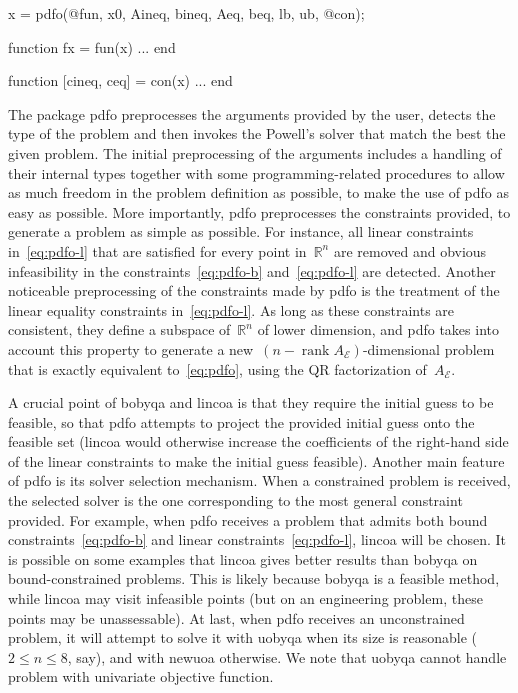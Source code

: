 \documentclass[11pt,draft]{article}
\numberwithin{equation}{section}
\DeclareMathOperator\rank{rank}
\newcommand{\R}{\mathbb{R}}
\newcommand{\aeq}{A_{\scriptscriptstyle\mathcal{E}}}
\begin{document}
\begin{matlablst}[%
    caption=An elementary example of \gls{pdfo} in MATLAB,
    label=lst:minex
]
    x = pdfo(@fun, x0, Aineq, bineq, Aeq, beq, lb, ub, @con);

    function fx = fun(x)
    ...
    end

    function [cineq, ceq] = con(x)
    ...
    end
\end{matlablst}

The package \gls{pdfo} preprocesses the arguments provided by the user, detects the type of the problem and then invokes the Powell's solver that match the best the given problem.
The initial preprocessing of the arguments includes a handling of their internal types together with some programming-related procedures to allow as much freedom in the problem definition as possible, to make the use of \gls{pdfo} as easy as possible.
More importantly, \gls{pdfo} preprocesses the constraints provided, to generate a problem as simple as possible.
For instance, all linear constraints in~\cref{eq:pdfo-l} that are satisfied for every point in~$\R^n$ are removed and obvious infeasibility in the constraints~\cref{eq:pdfo-b} and~\cref{eq:pdfo-l} are detected.
Another noticeable preprocessing of the constraints made by \gls{pdfo} is the treatment of the linear equality constraints in~\cref{eq:pdfo-l}.
As long as these constraints are consistent, they define a subspace of~$\R^n$ of lower dimension, and \gls{pdfo} takes into account this property to generate a new~$(n - \rank \aeq)$-dimensional problem that is exactly equivalent to~\cref{eq:pdfo}, using the QR factorization of~$\aeq$.

A crucial point of \gls{bobyqa} and \gls{lincoa} is that they require the initial guess to be feasible, so that \gls{pdfo} attempts to project the provided initial guess onto the feasible set (\gls{lincoa} would otherwise increase the coefficients of the right-hand side of the linear constraints to make the initial guess feasible).
Another main feature of \gls{pdfo} is its solver selection mechanism.
When a constrained problem is received, the selected solver is the one corresponding to the most general constraint provided.
For example, when \gls{pdfo} receives a problem that admits both bound constraints~\cref{eq:pdfo-b} and linear constraints~\cref{eq:pdfo-l}, \gls{lincoa} will be chosen.
It is possible on some examples that \gls{lincoa} gives better results than \gls{bobyqa} on bound-constrained problems.
This is likely because \gls{bobyqa} is a feasible method, while \gls{lincoa} may visit infeasible points (but on an engineering problem, these points may be unassessable).
At last, when \gls{pdfo} receives an unconstrained problem, it will attempt to solve it with \gls{uobyqa} when its size is reasonable ($2 \le n \le 8$, say), and with \gls{newuoa} otherwise.
We note that \gls{uobyqa} cannot handle problem with univariate objective function.
\end{document}
